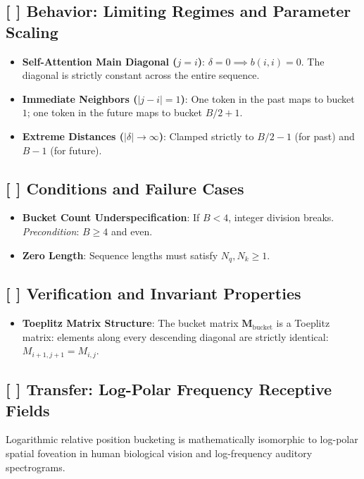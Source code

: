 \documentclass[11pt,a4paper]{article}
\theoremstyle{definition}
\begin{document}
\subsection{[ ] Behavior: Limiting Regimes and Parameter Scaling}
\begin{itemize}
    \item \textbf{Self-Attention Main Diagonal ($j = i$)}: $\delta = 0 \implies b(i, i) = 0$. The diagonal is strictly constant across the entire sequence.
    \item \textbf{Immediate Neighbors ($|j - i| = 1$)}: One token in the past maps to bucket $1$; one token in the future maps to bucket $B/2 + 1$.
    \item \textbf{Extreme Distances ($|\delta| \to \infty$)}: Clamped strictly to $B/2 - 1$ (for past) and $B - 1$ (for future).
\end{itemize}

\subsection{[ ] Conditions and Failure Cases}
\begin{itemize}
    \item \textbf{Bucket Count Underspecification}: If $B < 4$, integer division breaks. \emph{Precondition}: $B \ge 4$ and even.
    \item \textbf{Zero Length}: Sequence lengths must satisfy $N_q, N_k \ge 1$.
\end{itemize}

\subsection{[ ] Verification and Invariant Properties}
\begin{itemize}
    \item \textbf{Toeplitz Matrix Structure}: The bucket matrix $\mathbf{M}_{\text{bucket}}$ is a Toeplitz matrix: elements along every descending diagonal are strictly identical: $M_{i+1, j+1} = M_{i, j}$.
\end{itemize}

\subsection{[ ] Transfer: Log-Polar Frequency Receptive Fields}
Logarithmic relative position bucketing is mathematically isomorphic to log-polar spatial foveation in human biological vision and log-frequency auditory spectrograms.
\end{document}
